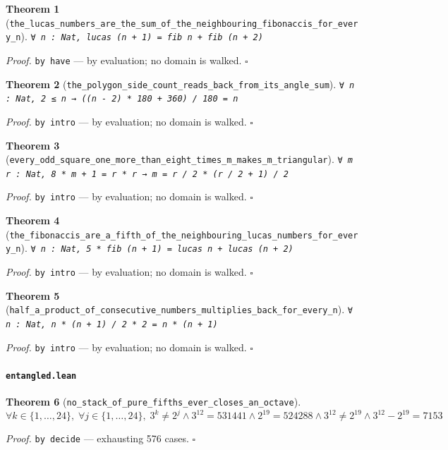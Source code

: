 \documentclass[11pt]{article}
\newtheorem{theorem}{Theorem}[section]
\begin{document}
\begin{theorem}[\texttt{the\_lucas\_numbers\_are\_the\_sum\_of\_the\_neighbouring\_fibonaccis\_for\_every\_n}]
\texttt{∀ n : Nat, lucas (n + 1) = fib n + fib (n + 2)}
\end{theorem}
\noindent\emph{Proof.} \texttt{by
  have} --- by evaluation; no domain is walked. \hfill$\square$

\begin{theorem}[\texttt{the\_polygon\_side\_count\_reads\_back\_from\_its\_angle\_sum}]
\texttt{∀ n : Nat, 2 ≤ n → ((n - 2) * 180 + 360) / 180 = n}
\end{theorem}
\noindent\emph{Proof.} \texttt{by
  intro} --- by evaluation; no domain is walked. \hfill$\square$

\begin{theorem}[\texttt{every\_odd\_square\_one\_more\_than\_eight\_times\_m\_makes\_m\_triangular}]
\texttt{∀ m r : Nat, 8 * m + 1 = r * r → m = r / 2 * (r / 2 + 1) / 2}
\end{theorem}
\noindent\emph{Proof.} \texttt{by
  intro} --- by evaluation; no domain is walked. \hfill$\square$

\begin{theorem}[\texttt{the\_fibonaccis\_are\_a\_fifth\_of\_the\_neighbouring\_lucas\_numbers\_for\_every\_n}]
\texttt{∀ n : Nat, 5 * fib (n + 1) = lucas n + lucas (n + 2)}
\end{theorem}
\noindent\emph{Proof.} \texttt{by
  intro} --- by evaluation; no domain is walked. \hfill$\square$

\begin{theorem}[\texttt{half\_a\_product\_of\_consecutive\_numbers\_multiplies\_back\_for\_every\_n}]
\texttt{∀ n : Nat, n * (n + 1) / 2 * 2 = n * (n + 1)}
\end{theorem}
\noindent\emph{Proof.} \texttt{by
  intro} --- by evaluation; no domain is walked. \hfill$\square$

\paragraph{\texttt{entangled.lean}}

\begin{theorem}[\texttt{no\_stack\_of\_pure\_fifths\_ever\_closes\_an\_octave}]
\[ \forall k \in \{1,\dots,24\},\; \forall j \in \{1,\dots,24\},\; 3^{k} \neq 2^{j} \land 3^{12} = 531441 \land 2^{19} = 524288 \land 3^{12} \neq 2^{19} \land 3^{12} - 2^{19} = 7153 \]
\end{theorem}
\noindent\emph{Proof.} \texttt{by decide} --- exhausting 576 cases. \hfill$\square$
\end{document}
